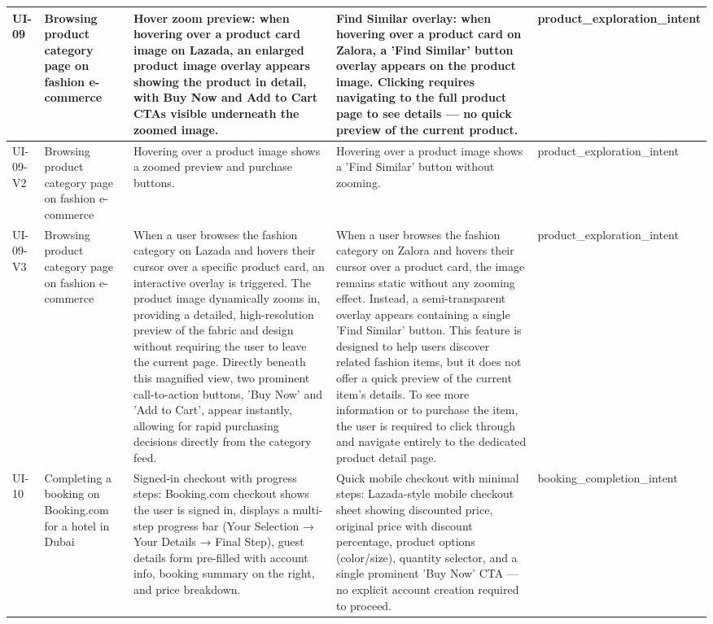 \begin{table}[h]
\begin{tabular}{p{1.5cm} p{3.5cm} p{4cm} p{4cm} p{2cm}}
\midrule
UI-09 & Browsing product category page on fashion e-commerce & Hover zoom preview: when hovering over a product card image on Lazada, an enlarged product image overlay appears showing the product in detail, with Buy Now and Add to Cart CTAs visible underneath the zoomed image. & Find Similar overlay: when hovering over a product card on Zalora, a 'Find Similar' button overlay appears on the product image. Clicking requires navigating to the full product page to see details — no quick preview of the current product. & product_exploration_intent \\
\midrule
UI-09-V2 & Browsing product category page on fashion e-commerce & Hovering over a product image shows a zoomed preview and purchase buttons. & Hovering over a product image shows a 'Find Similar' button without zooming. & product_exploration_intent \\
\midrule
UI-09-V3 & Browsing product category page on fashion e-commerce & When a user browses the fashion category on Lazada and hovers their cursor over a specific product card, an interactive overlay is triggered. The product image dynamically zooms in, providing a detailed, high-resolution preview of the fabric and design without requiring the user to leave the current page. Directly beneath this magnified view, two prominent call-to-action buttons, 'Buy Now' and 'Add to Cart', appear instantly, allowing for rapid purchasing decisions directly from the category feed. & When a user browses the fashion category on Zalora and hovers their cursor over a product card, the image remains static without any zooming effect. Instead, a semi-transparent overlay appears containing a single 'Find Similar' button. This feature is designed to help users discover related fashion items, but it does not offer a quick preview of the current item's details. To see more information or to purchase the item, the user is required to click through and navigate entirely to the dedicated product detail page. & product_exploration_intent \\
\midrule
UI-10 & Completing a booking on Booking.com for a hotel in Dubai & Signed-in checkout with progress steps: Booking.com checkout shows the user is signed in, displays a multi-step progress bar (Your Selection → Your Details → Final Step), guest details form pre-filled with account info, booking summary on the right, and price breakdown. & Quick mobile checkout with minimal steps: Lazada-style mobile checkout sheet showing discounted price, original price with discount percentage, product options (color/size), quantity selector, and a single prominent 'Buy Now' CTA — no explicit account creation required to proceed. & booking_completion_intent \\

\end{tabular}
\end{table}
